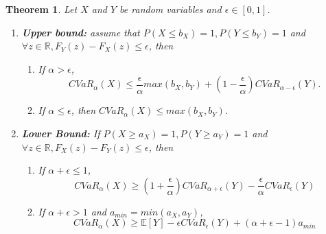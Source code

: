 \documentclass[letterpaper]{article} %
\newtheorem{theorem}{Theorem}[section]
\begin{document}
\begin{theorem}\label{thm:cvar_bound_v2}
	Let $X$ and $Y$ be random variables and $\epsilon \in [0, 1]$. 
	\begin{enumerate}
		\item \textbf{Upper bound:} assume that $P(X\leq b_X)=1, P(Y\leq b_Y)=1$ and $\forall z\in \mathbb{R},F_Y(z)-F_X(z)\leq \epsilon$, then 
		\begin{enumerate}
			\item If $\alpha > \epsilon$, \begin{equation}\label{eq:general_cvar_upper_bound_1}
				CVaR_\alpha(X) \leq \frac{\epsilon}{\alpha}max(b_X,b_Y) + (1 - \frac{\epsilon}{\alpha})CVaR_{\alpha-\epsilon}(Y).
			\end{equation}
			
			\item If $\alpha \leq \epsilon$, then $CVaR_\alpha(X)\leq max(b_X,b_Y)$.
		\end{enumerate}
		
		\item \textbf{Lower Bound:} If $P(X\geq a_X)=1, P(Y\geq a_Y)=1$ and $\forall z\in \mathbb{R},F_X(z)-F_Y(z)\leq \epsilon$, then
		\begin{enumerate}
			\item If $\alpha+\epsilon \leq 1$, \begin{equation}\label{eq:general_cvar_lower_bound_1}
				CVaR_{\alpha}(X)\geq (1+\frac{\epsilon}{\alpha})CVaR_{\alpha+\epsilon}(Y)-\frac{\epsilon}{\alpha} CVaR_{\epsilon}(Y)
			\end{equation}
			
			\item If $\alpha+\epsilon > 1$ and $a_{min} = min(a_X, a_Y)$, \begin{equation}
				CVaR_\alpha(X) \geq \mathbb{E}[Y] - \epsilon CVaR_\epsilon(Y) + (\alpha+\epsilon-1)a_{min}
			\end{equation}
		\end{enumerate}
	\end{enumerate}
\end{theorem}
\end{document}
